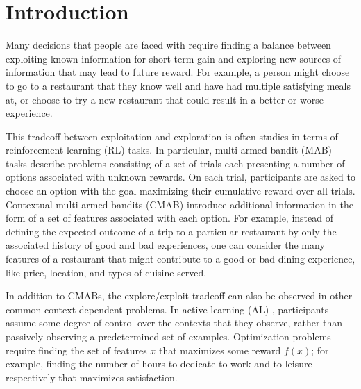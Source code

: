 \documentclass[10pt,letterpaper]{article}
\title{}
\author{}
\begin{document}
	
	\maketitle
	
	
	\begin{abstract}
		
		

		
	\end{abstract}
	
	
	\section{Introduction}
	
		Many decisions that people are faced with require finding a balance between exploiting known information for short-term gain and exploring new sources of information that may lead to future reward. For example, a person might choose to go to a restaurant that they know well and have had multiple satisfying meals at, or choose to try a new restaurant that could result in a better or worse experience.
	
		This tradeoff between exploitation and exploration is often studies in terms of reinforcement learning (RL) tasks. In particular, multi-armed bandit (MAB) tasks \cite{SteyversLeeWagenmakers2009a} describe problems consisting of a set of trials each presenting a number of options associated with unknown rewards. On each trial, participants are asked to choose an option with the goal maximizing their cumulative reward over all trials. Contextual multi-armed bandits (CMAB) \cite{SchulzEmmanouilSpeekenbrink2017a} introduce additional information in the form of a set of features associated with each option. For example, instead of defining the expected outcome of a trip to a particular restaurant by only the associated history of good and bad experiences, one can consider the many features of a restaurant that might contribute to a good or bad dining experience, like price, location, and types of cuisine served.
		
		In addition to CMABs, the explore/exploit tradeoff can also be observed in other common context-dependent problems. In active learning (AL) \cite{BramleyGerstenbergTenenbaum2016a}, participants assume some degree of control over the contexts that they observe, rather than passively observing a predetermined set of examples. Optimization problems \cite{Rachlin1981a} require finding the set of features $x$ that maximizes some reward $f(x)$; for example, finding the number of hours to dedicate to work and to leisure respectively that maximizes satisfaction.
		
\end{document}
